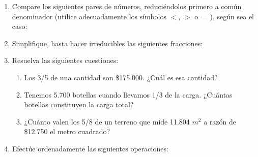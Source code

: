 \documentclass[twoside]{article}
\begin{document}
\begin{enumerate}
\begin{enumerate}
\end{enumerate}
\item Compare los siguientes pares de números, reduciéndolos primero a común denominador (utilice adecuadamente los símbolos $<$, $>$ o $=$), según sea el caso:
\begin{enumerate}
\end{enumerate}
\item Simplifique, hasta hacer irreducibles las siguientes fracciones:
\begin{enumerate}
\end{enumerate}
\item Resuelva las siguientes cuestiones:
\begin{enumerate}
\item Los 3/5 de una cantidad son \$175.000. ¿Cuál es esa cantidad?
\item Tenemos 5.700 botellas cuando llevamos 1/3 de la carga. ¿Cuántas botellas constituyen la carga total?
\item ¿Cuánto valen los 5/8 de un terreno que mide 11.804 $m^{2}$ a razón de \$12.750 el metro cuadrado?
\end{enumerate}
\item Efectúe ordenadamente las siguientes operaciones:
\begin{enumerate}
\begin{multicols}{2}

\end{multicols}
\end{enumerate}
\end{enumerate}
\end{document}
